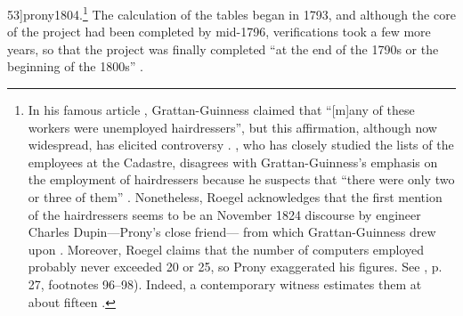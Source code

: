 \documentclass[version=last,draft=false,paper=A4,portrait,twoside=true,twocolumn=false,headinclude=false,footinclude=false,mpinclude=true,fontsize=12,BCOR=20mm,DIV=calc,pagesize=auto,open=right,chapterprefix=true,numbers=autoendperiod,headsepline=false,headings=twolinechapter,parskip=false]{scrbook}
\begin{document}
53]{prony1804}.\footnote{In his famous article ,
Grattan-Guinness claimed that ``[m]any of these workers were unemployed
hairdressers'', but this affirmation, although now widespread, has elicited
controversy \autocite[p. 179]{grattan-guinness1990}. \textcite{roegel2011},
who has closely studied the lists of the employees at the Cadastre,
disagrees with Grattan-Guinness's emphasis on the employment of
hairdressers because he suspects that ``there were only two or three of
them'' \parencite[p. 26]{roegel2011}. Nonetheless, Roegel acknowledges
that the first mention of the hairdressers seems to be an 
November 1824 discourse by engineer Charles Dupin---Prony's close friend---
from which Grattan-Guinness drew upon \parencite{dupin1824}. Moreover, Roegel
claims that the number of computers employed probably never exceeded 20 or
25, so Prony exaggerated his figures. See \textcite{roegel2011}, p. 27, footnotes
96--98). Indeed, a contemporary witness estimates them at about fifteen
\autocite[p. 744]{laLande1803}.} The calculation of the tables began in 1793, and although the
core of the project had been completed by mid-1796, verifications took a
few more years, so that the project was finally completed ``at the end of
the 1790s or the beginning of the 1800s'' \autocite[p. 37]{roegel2011}.
\end{document}
